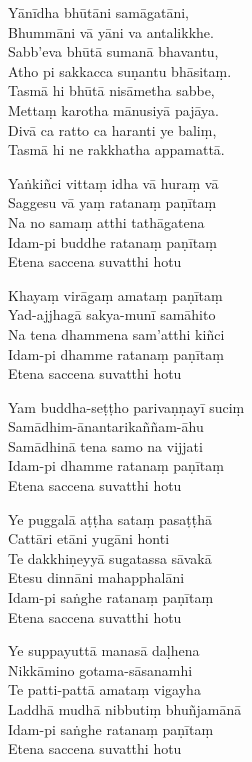 \begin{paritta}

Yānīdha bhūtāni samāgatāni,\\
Bhummāni vā yāni va antalikkhe.\\
Sabb'eva bhūtā sumanā bhavantu,\\
Atho pi sakkacca suṇantu bhāsitaṃ.\\
Tasmā hi bhūtā nisāmetha sabbe,\\
Mettaṃ karotha mānusiyā pajāya.\\
Divā ca ratto ca haranti ye baliṃ,\\
Tasmā hi ne rakkhatha appamattā.

%
Yaṅkiñci vittaṃ idha vā huraṃ vā\\
Saggesu vā yaṃ ratanaṃ paṇītaṃ\\
Na no samaṃ atthi tathāgatena\\
Idam-pi buddhe ratanaṃ paṇītaṃ\\
Etena saccena suvatthi hotu

\clearpage

%
Khayaṃ virāgaṃ amataṃ paṇītaṃ\\
Yad-ajjhagā sakya-munī samāhito\\
Na tena dhammena sam'atthi kiñci\\
Idam-pi dhamme ratanaṃ paṇītaṃ\\
Etena saccena suvatthi hotu

%
Yam buddha-seṭṭho parivaṇṇayī suciṃ\\
Samādhim-ānantarikaññam-āhu\\
Samādhinā tena samo na vijjati\\
Idam-pi dhamme ratanaṃ paṇītaṃ\\
Etena saccena suvatthi hotu

%
Ye puggalā aṭṭha sataṃ pasaṭṭhā\\
Cattāri etāni yugāni honti\\
Te dakkhiṇeyyā sugatassa sāvakā\\
Etesu dinnāni mahapphalāni\\
Idam-pi saṅghe ratanaṃ paṇītaṃ\\
Etena saccena suvatthi hotu

%
Ye suppayuttā manasā daḷhena\\
Nikkāmino gotama-sāsanamhi\\
Te patti-pattā amataṃ vigayha\\
Laddhā mudhā nibbutiṃ bhuñjamānā\\
Idam-pi saṅghe ratanaṃ paṇītaṃ\\
Etena saccena suvatthi hotu


\end{paritta}
